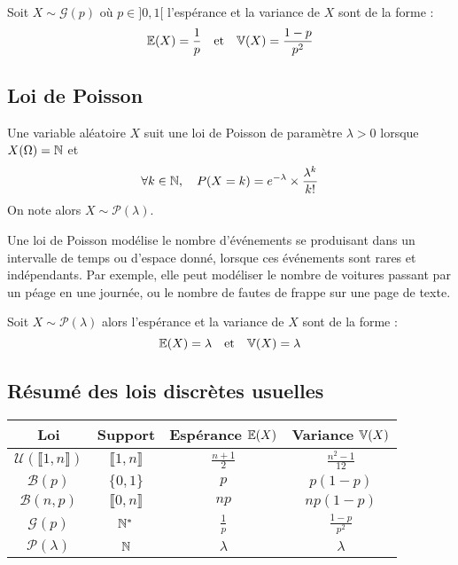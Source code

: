\begin{proposition}
    Soit $X \sim \mathcal{G}(p)$ où $p \in ]0,1[$ l'espérance et la variance de $X$ sont de la forme :
        \[ \mathbb{E}(X) = \frac{1}{p} \quad \text{et} \quad \mathbb{V}(X) = \frac{1-p}{p^2} \] 
\end{proposition}

\subsection{Loi de Poisson}

\begin{definition}
    Une variable aléatoire $X$ suit une loi de Poisson de paramètre $\lambda > 0$ lorsque $X(\Omega) = \mathbb{N}$ et 
        \[ \forall k \in \mathbb{N}, \quad P(X = k) = e^{- \lambda} \times \frac{\lambda^k}{k!} \]  
    On note alors $ X \sim \mathcal{P}(\lambda)$. 
\end{definition}

Une loi de Poisson modélise le nombre d'événements se produisant dans un intervalle de temps ou d’espace donné, lorsque ces événements sont rares et indépendants.
Par exemple, elle peut modéliser le nombre de voitures passant par un péage en une journée, ou le nombre de fautes de frappe sur une page de texte.

\begin{proposition}
    Soit $ X \sim \mathcal{P}(\lambda)$ alors l'espérance et la variance de $X$ sont de la forme :
        \[ \mathbb{E}(X) = \lambda \quad \text{et} \quad \mathbb{V}(X) = \lambda  \] 
\end{proposition}

\subsection*{Résumé des lois discrètes usuelles}

\begin{center}
    \begin{tabular}{|c|c|c|c|}
        \hline
        \textbf{Loi} & \textbf{Support} & \textbf{Espérance $\mathbb{E}(X)$} & \textbf{Variance $\mathbb{V}(X)$} \\
        \hline
        $\mathcal{U}(\llbracket 1, n \rrbracket)$ & $\llbracket 1, n \rrbracket$ & $\frac{n+1}{2}$ & $\frac{n^2 - 1}{12}$ \\
        \hline
        $\mathcal{B}(p)$ & $\{0,1\}$ & $p$ & $p(1-p)$ \\
        \hline
        $\mathcal{B}(n, p)$ & $\llbracket 0, n \rrbracket$ & $np$ & $np(1-p)$ \\
        \hline
        $\mathcal{G}(p)$ & $\mathbb{N}^*$ & $\frac{1}{p}$ & $\frac{1-p}{p^2}$ \\
        \hline
        $\mathcal{P}(\lambda)$ & $\mathbb{N}$ & $\lambda$ & $\lambda$ \\
        \hline
    \end{tabular}
\end{center}


